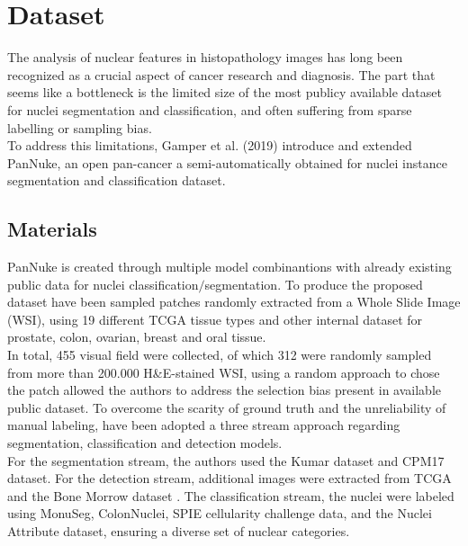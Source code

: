 \documentclass[target=bach,aauheader=,style=]{thud}
\begin{document}
\chapter{Dataset}
\label{sec:dataset}
The analysis of nuclear features in histopathology images has long been recognized as a crucial aspect of cancer research and diagnosis. The part that seems like a bottleneck is the limited size of the most publicy available dataset for nuclei segmentation and classification, and often suffering from sparse labelling or sampling bias.\\
To address this limitations, Gamper et al. (2019) 
\cite{gamper2019pannuke,gamper2020pannuke} introduce and extended PanNuke, an open pan-cancer a semi-automatically obtained for nuclei instance segmentation and classification dataset.

\section{Materials}
PanNuke is created through multiple model combinantions with already existing public data for nuclei classification$/$segmentation. To produce the proposed dataset have been sampled patches randomly extracted from a Whole Slide Image (WSI), using 19 different TCGA tissue types and other internal dataset for prostate, colon, ovarian, breast and oral tissue.\\
In total, 455 visual field were collected, of which 312 were randomly sampled from more than 200.000 H\&E-stained WSI, using a random approach to chose the patch allowed the authors to address the selection bias present in available public dataset. To overcome the scarity of ground truth and the unreliability of manual labeling, have been adopted a three stream approach regarding segmentation, classification and detection models.\\
For the segmentation stream, the authors used the Kumar \cite{article} dataset and CPM17 \cite{vu2018methodssegmentationclassificationdigital} dataset. For the detection stream, additional images were extracted from TCGA and the Bone Morrow \cite{10.1007/978-3-319-24574-4_33} dataset  . The classification stream, the nuclei were labeled using MonuSeg, ColonNuclei, SPIE cellularity challenge data, and the Nuclei Attribute dataset, ensuring a diverse set of nuclear categories.\\
\end{document}
